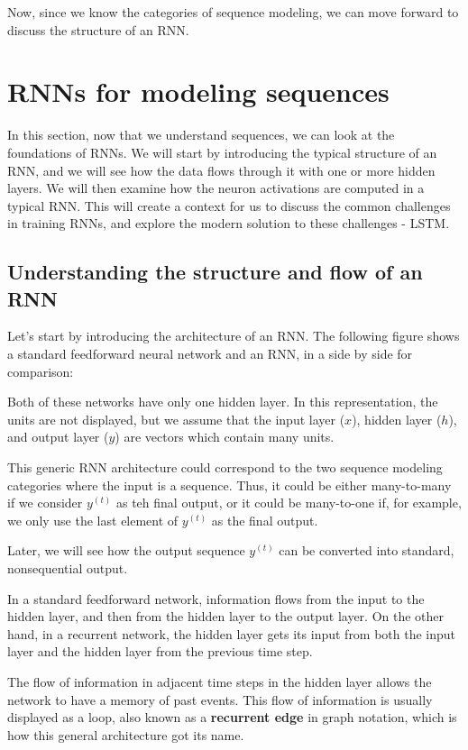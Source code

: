 \documentclass[11pt]{article}
\begin{document}
Now, since we know the categories of sequence modeling, we can move
forward to discuss the structure of an RNN.

    \section{RNNs for modeling sequences}\label{rnns-for-modeling-sequences}

    In this section, now that we understand sequences, we can look at the
foundations of RNNs. We will start by introducing the typical structure
of an RNN, and we will see how the data flows through it with one or
more hidden layers. We will then examine how the neuron activations are
computed in a typical RNN. This will create a context for us to discuss
the common challenges in training RNNs, and explore the modern solution
to these challenges - LSTM.

    \subsection{Understanding the structure and flow of an
RNN}\label{understanding-the-structure-and-flow-of-an-rnn}

    Let's start by introducing the architecture of an RNN. The following
figure shows a standard feedforward neural network and an RNN, in a side
by side for comparison:

    Both of these networks have only one hidden layer. In this
representation, the units are not displayed, but we assume that the
input layer (\(x\)), hidden layer (\(h\)), and output layer (\(y\)) are
vectors which contain many units.

This generic RNN architecture could correspond to the two sequence
modeling categories where the input is a sequence. Thus, it could be
either many-to-many if we consider \(y^{(t)}\) as teh final output, or
it could be many-to-one if, for example, we only use the last element of
\(y^{(t)}\) as the final output.

Later, we will see how the output sequence \(y^{(t)}\) can be converted
into standard, nonsequential output.

In a standard feedforward network, information flows from the input to
the hidden layer, and then from the hidden layer to the output layer. On
the other hand, in a recurrent network, the hidden layer gets its input
from both the input layer and the hidden layer from the previous time
step.

The flow of information in adjacent time steps in the hidden layer
allows the network to have a memory of past events. This flow of
information is usually displayed as a loop, also known as a
\textbf{recurrent edge} in graph notation, which is how this general
architecture got its name.
\end{document}
